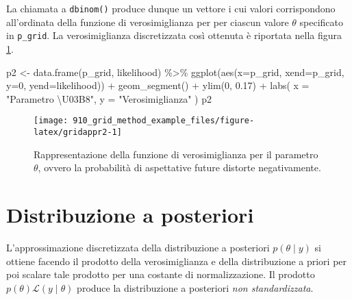 \documentclass[
]{memoir}
\newenvironment{Shaded}{\begin{snugshade}}{\end{snugshade}}
\newcommand{\AttributeTok}[1]{\textcolor[rgb]{0.77,0.63,0.00}{#1}}
\newcommand{\DecValTok}[1]{\textcolor[rgb]{0.00,0.00,0.81}{#1}}
\newcommand{\FloatTok}[1]{\textcolor[rgb]{0.00,0.00,0.81}{#1}}
\newcommand{\FunctionTok}[1]{\textcolor[rgb]{0.00,0.00,0.00}{#1}}
\newcommand{\NormalTok}[1]{#1}
\newcommand{\OtherTok}[1]{\textcolor[rgb]{0.56,0.35,0.01}{#1}}
\newcommand{\SpecialCharTok}[1]{\textcolor[rgb]{0.00,0.00,0.00}{#1}}
\newcommand{\StringTok}[1]{\textcolor[rgb]{0.31,0.60,0.02}{#1}}
\begin{document}
La chiamata a \texttt{dbinom()} produce dunque un vettore i cui valori corrispondono all'ordinata della funzione di verosimiglianza per per ciascun valore \(\theta\) specificato in \texttt{p\_grid}. La verosimiglianza discretizzata così ottenuta è riportata nella figura \ref{fig:gridappr2}.

\begin{Shaded}
\begin{Highlighting}[]
\NormalTok{p2 }\OtherTok{\textless{}{-}} \FunctionTok{data.frame}\NormalTok{(p\_grid, likelihood) }\SpecialCharTok{\%\textgreater{}\%}
  \FunctionTok{ggplot}\NormalTok{(}\FunctionTok{aes}\NormalTok{(}\AttributeTok{x=}\NormalTok{p\_grid, }\AttributeTok{xend=}\NormalTok{p\_grid, }\AttributeTok{y=}\DecValTok{0}\NormalTok{, }\AttributeTok{yend=}\NormalTok{likelihood)) }\SpecialCharTok{+}
  \FunctionTok{geom\_segment}\NormalTok{() }\SpecialCharTok{+}
  \FunctionTok{ylim}\NormalTok{(}\DecValTok{0}\NormalTok{, }\FloatTok{0.17}\NormalTok{) }\SpecialCharTok{+}
  \FunctionTok{labs}\NormalTok{(}
    \AttributeTok{x =} \StringTok{"Parametro \textbackslash{}U03B8"}\NormalTok{,}
    \AttributeTok{y =} \StringTok{"Verosimiglianza"}
\NormalTok{  )}
\NormalTok{p2}
\end{Highlighting}
\end{Shaded}

\begin{figure}

{\centering \texttt{[image: 910\_grid\_method\_example\_files/figure-latex/gridappr2-1]} 

}

\caption{Rappresentazione della funzione di verosimiglianza per il parametro $\theta$, ovvero la probabilità di aspettative future distorte negativamente.}\label{fig:gridappr2}
\end{figure}

\hypertarget{distribuzione-a-posteriori}{%
\section{Distribuzione a posteriori}\label{distribuzione-a-posteriori}}

L'approssimazione discretizzata della distribuzione a posteriori \(p(\theta \mid y)\) si ottiene facendo il prodotto della verosimiglianza e della distribuzione a priori per poi scalare tale prodotto per una costante di normalizzazione. Il prodotto \(p(\theta)\mathcal{L}(y \mid \theta)\) produce la distribuzione a posteriori \emph{non standardizzata}.
\end{document}
